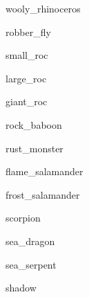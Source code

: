 \documentclass[letterpaper,serif]{module}
\begin{document}
\begin{newmonster}{wooly_rhinoceros}\end{newmonster}

\begin{newmonster}{robber_fly}\end{newmonster}


\begin{newmonster}{small_roc}\end{newmonster}

\begin{newmonster}{large_roc}\end{newmonster}

\begin{newmonster}{giant_roc}\end{newmonster}

\begin{newmonster}{rock_baboon}\end{newmonster}

\begin{newmonster}{rust_monster}\end{newmonster}


\begin{newmonster}{flame_salamander}\end{newmonster}

\begin{newmonster}{frost_salamander}\end{newmonster}

\begin{newmonster}{scorpion}\end{newmonster}

\begin{newmonster}{sea_dragon}\end{newmonster}

\begin{newmonster}{sea_serpent}\end{newmonster}

\begin{newmonster}{shadow}\end{newmonster}
\end{document}
